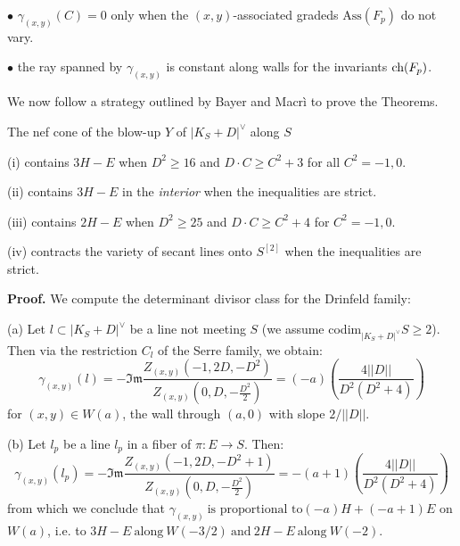 \documentclass{amsart}
\begin{document}
\medskip

$\bullet$ $\gamma_{(x,y)}(C) = 0$ only when the $(x,y)$-associated gradeds $\mbox{Ass}(F_p)$ do not vary. 

\medskip

$\bullet$ the ray spanned by $\gamma_{(x,y)}$ is constant along walls for the invariants $\mbox{ch}(F_p)$. 

\medskip

We now follow a strategy outlined by Bayer and Macr\`i to prove the Theorems. 

\medskip

 The nef cone of the blow-up $Y$ of $|K_S + D|^\vee$ along $S$ 

\medskip

(i) contains $3H - E$ when $D^2 \ge 16$ and $D \cdot C \ge C^2 + 3$ for all $C^2 = -1,0$. 

\medskip

(ii) contains $3H - E$ in the {\it interior} when the inequalities are strict. 

\medskip

(iii) contains $2H - E$ when $D^2 \ge 25$ and $D \cdot C \ge C^2 + 4$ for $C^2 = -1,0$. 

\medskip

(iv) contracts the variety of secant lines onto $S^{[2]}$ when the inequalities are strict. 

\medskip

{\bf Proof.} We compute the determinant divisor class for the Drinfeld family: 

\medskip

(a) Let $l \subset |K_S + D|^\vee$ be a line not meeting $S$ (we assume codim$_{|K_S + D|^\vee}S \ge 2$).
Then via the restriction $C_l$ of the Serre family, we obtain: 
\[ \gamma_{(x,y)}(l) = - \mathfrak{Im} \frac{ Z_{(x,y)}(-1,2D,-D^2)}{Z_{(x,y)}(0,D,-\frac {D^2}2)} = (-a) \left( \frac{4||D||}{D^2(D^2 + 4)} \right)  \]  
for $(x,y) \in W(a)$, the wall through $(a,0)$ with slope $2/||D||$.   

\medskip

(b) Let $l_p$ be a line $l_p$ in a fiber of $\pi:E \rightarrow S$. Then: 
\[ \gamma_{(x,y)}(l_p) = - \mathfrak{Im} \frac{ Z_{(x,y)}(-1,2D,-D^2 + 1)}{Z_{(x,y)}(0,D,-\frac {D^2}2)} = -(a + 1) \left( \frac{4||D||}{D^2(D^2 + 4)} \right) \] 
from which we conclude that
$\gamma_{(x,y)} \ \mbox{is proportional to} (-a)H + (-a + 1)E$ on $W(a)$, i.e. to
$3H - E \ \mbox{along} \ W(-3/2) \  \mbox{and} \  2H - E \ \mbox{along} \ W(-2)$.
\end{document}
